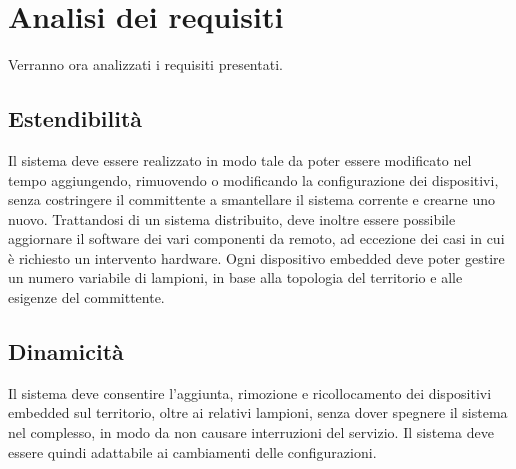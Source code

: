 \section{Analisi dei requisiti}
Verranno ora analizzati i requisiti presentati.
\subsection{Estendibilità}
Il sistema deve essere realizzato in modo tale da poter essere modificato nel tempo aggiungendo, rimuovendo o modificando la configurazione dei dispositivi, senza costringere il committente a smantellare il sistema corrente e crearne uno nuovo. Trattandosi di un sistema distribuito, deve inoltre essere possibile aggiornare il software dei vari componenti da remoto, ad eccezione dei casi in cui è richiesto un intervento hardware.
Ogni dispositivo embedded deve poter gestire un numero variabile di lampioni, in base alla topologia del territorio e alle esigenze del committente.
\subsection{Dinamicità}
Il sistema deve consentire l'aggiunta, rimozione e ricollocamento dei dispositivi embedded sul territorio, oltre ai relativi lampioni, senza dover spegnere il sistema nel complesso, in modo da non causare interruzioni del servizio. Il sistema deve essere quindi adattabile ai cambiamenti delle configurazioni.
